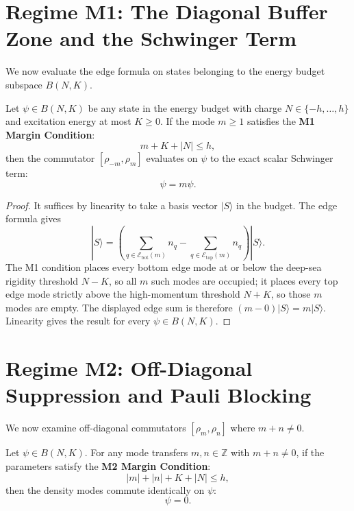 \section{Regime M1: The Diagonal Buffer Zone and the Schwinger Term}

We now evaluate the edge formula on states belonging to the energy budget subspace $B(N, K)$.

\begin{theorem}
\label{thm:regime_m1}
Let $\psi \in B(N, K)$ be any state in the energy budget with charge $N \in \{-h, \dots, h\}$ and excitation energy at most $K \ge 0$.
If the mode $m \ge 1$ satisfies the \textbf{M1 Margin Condition}:
\begin{equation}
m + K + |N| \le h,
\end{equation}
then the commutator $[\rho_{-m}, \rho_m]$ evaluates on $\psi$ to the exact scalar Schwinger term:
\begin{equation}
[\rho_{-m}, \rho_m] \psi = m \psi.
\end{equation}
\end{theorem}

\begin{proof}
It suffices by linearity to take a basis vector $|S\rangle$ in the budget. The edge formula gives
\begin{equation}
[\rho_{-m},\rho_m]|S\rangle=\left(\sum_{q\in\mathcal{E}_{\mathrm{bot}}(m)}n_q-\sum_{q\in\mathcal{E}_{\mathrm{top}}(m)}n_q\right)|S\rangle.
\end{equation}
The M1 condition places every bottom edge mode at or below the deep-sea rigidity threshold $N-K$, so all $m$ such modes are occupied; it places every top edge mode strictly above the high-momentum threshold $N+K$, so those $m$ modes are empty. The displayed edge sum is therefore $(m-0)|S\rangle=m|S\rangle$. Linearity gives the result for every $\psi\in B(N,K)$.
\end{proof}

\section{Regime M2: Off-Diagonal Suppression and Pauli Blocking}

We now examine off-diagonal commutators $[\rho_m, \rho_n]$ where $m + n \neq 0$.

\begin{theorem}
\label{thm:regime_m2}
Let $\psi \in B(N, K)$. For any mode transfers $m, n \in \mathbb{Z}$ with $m + n \neq 0$, if the parameters satisfy the \textbf{M2 Margin Condition}:
\begin{equation}
|m| + |n| + K + |N| \le h,
\end{equation}
then the density modes commute identically on $\psi$:
\begin{equation}
[\rho_m, \rho_n] \psi = 0.
\end{equation}
\end{theorem}

